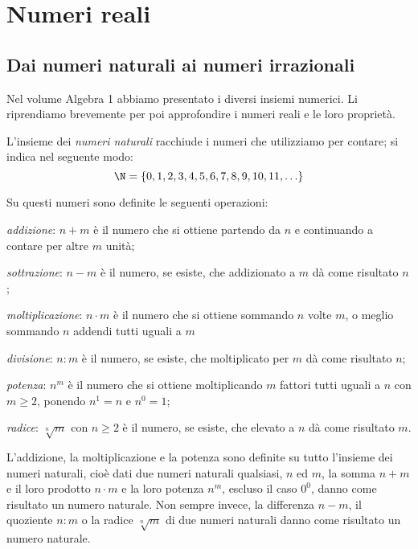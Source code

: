 
\chapter{Numeri reali}
\section{Dai numeri naturali ai numeri irrazionali}
Nel volume Algebra 1 abbiamo presentato i diversi insiemi numerici. Li 
riprendiamo brevemente per poi approfondire i numeri reali e le loro proprietà.

L'insieme dei \emph{numeri naturali} racchiude i numeri che utilizziamo per 
contare; si indica nel seguente modo:
\[\N=\{0,1,2,3,4,5,6,7,8,9,10,11,\ldots\}\]

Su questi numeri sono definite le seguenti operazioni:
\begin{itemize*}
 \item \emph{addizione}: \(n+m\) è il numero che si ottiene partendo da \(n\) 
e 
  continuando a contare per altre \(m\) unità;
 \item \emph{sottrazione}: \(n-m\) è il numero, se esiste, che 
  addizionato a \(m\) dà come risultato \(n\);
 \item \emph{moltiplicazione}: \(n \cdot m\) è il numero che si ottiene 
sommando 
  \(n\) volte \(m\), o meglio sommando \(n\) addendi tutti uguali a \(m\)
 \item \emph{divisione}: \(n:m\) è il numero, se esiste, che 
  moltiplicato per \(m\) dà come risultato \(n\);
 \item \emph{potenza}: \(n^{m}\) è il numero che si ottiene moltiplicando 
\(m\) 
  fattori tutti uguali a \(n\) con \(m \ge 2\), ponendo \(n^{1}=n\) e 
\(n^{0}=1\);
 \item \emph{radice}: \(\sqrt[{n}]{m}\) con \(n\ge 2\) è il numero, se 
esiste, 
  che elevato a \(n\) dà come risultato \(m\).
\end{itemize*}

L'addizione, la moltiplicazione e la potenza sono definite su tutto l'insieme 
dei numeri naturali, cioè dati due numeri naturali qualsiasi, \(n\) ed \(m\), 
la 
somma \(n+m\) e il loro prodotto \(n \cdot m\) e la loro potenza \(n^{m}\), 
escluso il caso \(0^{0}\), danno come risultato un numero naturale. 
Non sempre invece, la differenza \(n-m\), il quoziente \(n:m\) o la 
radice \(\sqrt[{n}]{m}\) di due numeri naturali danno come risultato un 
numero 
naturale.

